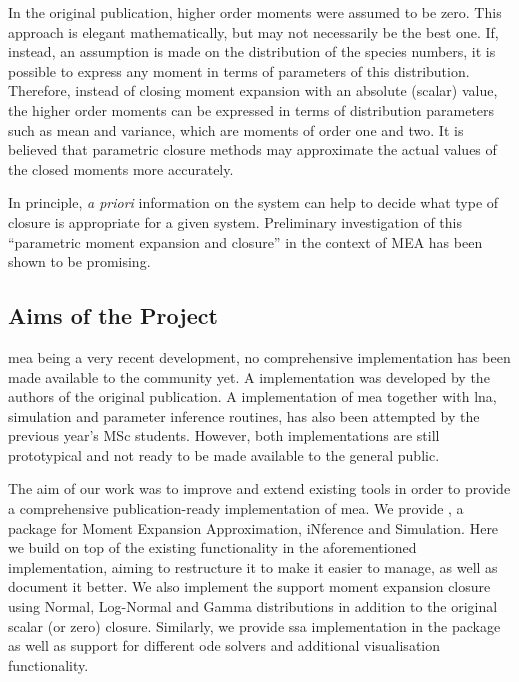 In the original publication\cite{ale_general_2013}, higher order moments were assumed to be zero. 
This approach is elegant mathematically, but may not necessarily be the best one.
If, instead, an assumption is made on the distribution of the species numbers, it is possible
to express any moment in terms of parameters of this distribution\cite{milner_moment_2011}.
Therefore, instead of closing moment expansion with an absolute (scalar) value, the higher order moments can be expressed in
terms of distribution parameters such as mean and variance, which are moments of order one and two. 
It is believed that parametric closure methods may approximate the actual values of the closed moments more accurately.

In principle, \emph{a priori} information on the system can help to decide what type of closure is appropriate for a given system.
Preliminary investigation of this ``parametric moment expansion and closure'' in the context of MEA has been shown to be promising\cite{lakatos_preparation_2014}.

\subsection{Aims of the Project}

\gls{mea} being a very recent development, no comprehensive implementation has been made available to the community yet.
A \mat{} implementation was developed by the authors of the original publication. A \py{} implementation of \gls{mea} together with \gls{lna}, simulation and parameter inference routines, has also been attempted by the previous year's MSc students\cite{babtie_moment_2013}.
However, both implementations are still prototypical and not ready to be made available to the general public.
 
The aim of our work was to improve and extend existing tools in order to provide a comprehensive publication-ready implementation of \gls{mea}.
We provide \means{}, a \py{} package for Moment Expansion Approximation, iNference and Simulation. 
Here we build on top of the existing functionality in the aforementioned \py{} implementation, aiming to restructure it to make it easier to manage, as well as document it better. 
We also implement the support moment expansion closure using Normal, Log-Normal and Gamma distributions in addition to the original scalar (or zero) closure. Similarly, we provide \gls{ssa} implementation in the package as well as support for different \gls{ode} solvers and additional visualisation functionality.

